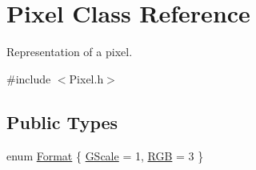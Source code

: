 \hypertarget{class_pixel}{}\section{Pixel Class Reference}
\label{class_pixel}


Representation of a pixel.  




{\ttfamily \#include $<$Pixel.\+h$>$}

\subsection*{Public Types}
\begin{DoxyCompactItemize}
\item 
enum \mbox{\hyperlink{class_pixel_aa1531d5d16ab3ab809a8e071145f0a50}{Format}} \{ \mbox{\hyperlink{class_pixel_aa1531d5d16ab3ab809a8e071145f0a50a0067e32761943fc277951f656686ce1a}{G\+Scale}} = 1, 
\mbox{\hyperlink{class_pixel_aa1531d5d16ab3ab809a8e071145f0a50aff2c7eeaaaaf24a83e97388116481444}{R\+GB}} = 3
 \}
\end{DoxyCompactItemize}

